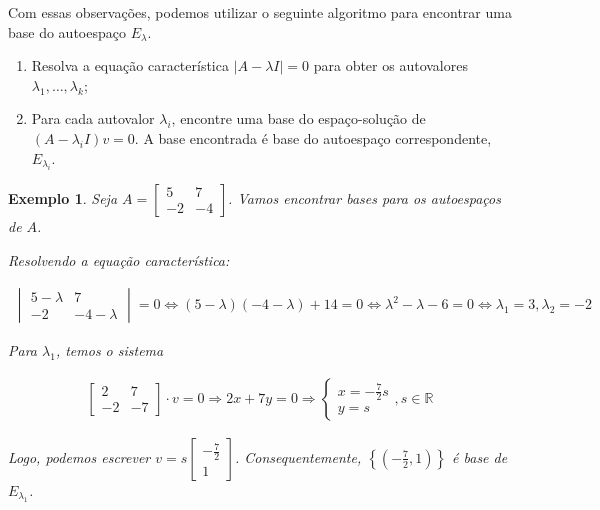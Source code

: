 \documentclass{article}
\newtheorem*{example}{Exemplo}
\begin{document}
\par\vspace{0.3cm} Com essas observações, podemos utilizar o seguinte algoritmo para encontrar uma base do autoespaço $E_{\lambda}$.

\begin{enumerate}
	\item Resolva a equação característica $|A - \lambda I| = 0$ para obter os autovalores $\lambda_1, \dots, \lambda_k$;
	\item Para cada autovalor $\lambda_i$, encontre uma base do espaço-solução de $(A - \lambda_iI)v = 0$. A base encontrada é base do autoespaço correspondente, $E_{\lambda_i}$.
\end{enumerate}

\begin{example}
	Seja $\displaystyle{A = \begin{bmatrix}
		5 & 7 \\
		-2 & -4
		\end{bmatrix}}$. Vamos encontrar bases para os autoespaços de $A$.
	
	\par\vspace{0.3cm} Resolvendo a equação característica:
	
	\begin{align*}
	\begin{vmatrix}
	5-\lambda & 7 \\
	-2 & -4-\lambda
	\end{vmatrix} = 0 \Leftrightarrow (5-\lambda)(-4-\lambda) + 14 = 0 \Leftrightarrow \lambda^2 - \lambda - 6 = 0 \Leftrightarrow \lambda_1 = 3, \lambda_2 = -2
	\end{align*}
	
	\par\vspace{0.3cm} Para $\lambda_1$, temos o sistema
	
	\begin{align*}
	\begin{bmatrix}
	2 & 7 \\
	-2 & -7
	\end{bmatrix}\cdot v = 0 \Rightarrow 2x + 7y = 0 \Rightarrow \begin{cases}
	x = \displaystyle{-\frac{7}{2}}s \\
	y = s
	\end{cases}, s\in\mathbb{R} 
	\end{align*}
	
	\par\vspace{0.3cm} Logo, podemos escrever $\displaystyle{ v = s\begin{bmatrix}
		\displaystyle{-\frac{7}{2}} \\
		1
		\end{bmatrix}}$. Consequentemente, $\left\{ \left(\displaystyle{-\frac{7}{2}},1\right)   \right\}$ é base de $E_{\lambda_1}$.
	

\end{example}
\end{document}
